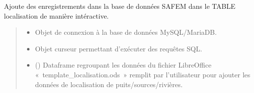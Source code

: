 \documentclass[letterpaper,10pt,french]{sphinxmanual}
\begin{document}

\begin{fulllineitems}
\label{\detokenize{library:lib_sql.insert_data_localisation}}
\pysigstartsignatures
\pysiglinewithargsret
{}
{\sphinxparamcomma {}\sphinxparamcomma {}}
{}
\pysigstopsignatures
\sphinxAtStartPar
Ajoute des enregistrements dans la base de données SAFE\sphinxhyphen{}M dans le TABLE
localisation de manière intéractive.
\begin{quote}\begin{description}
\begin{itemize}
\item {} 
\sphinxAtStartPar
{} \textendash{} Objet de connexion à la base de données MySQL/MariaDB.

\item {} 
\sphinxAtStartPar
{} \textendash{} Objet curseur permettant d’exécuter des requêtes SQL.

\item {} 
\sphinxAtStartPar
{} () \textendash{} Dataframe regroupant les données du fichier LibreOffice « template\_localisation.ods »
remplit par l’utilisateur pour ajouter les données de localisation de puits/sources/rivières.

\end{itemize}

\end{description}\end{quote}

\end{fulllineitems}

\end{document}
